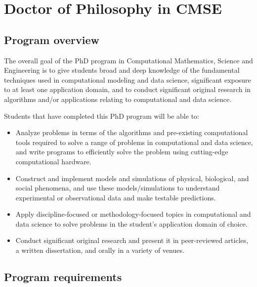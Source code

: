 \section{Doctor of Philosophy in CMSE}
\label{sec:phd}

\subsection{Program overview}
\label{sec:phd_overview}

The overall goal of the PhD program in Computational Mathematics,
Science and Engineering is to give students broad and deep knowledge
of the fundamental techniques used in computational modeling and data
science, significant exposure to at least one application domain, and
to conduct significant original research in algorithms and/or
applications relating to computational and data science.

\vspace{2mm}
\noindent
Students that have completed this PhD program will be able to:

\begin{itemize}
\item  Analyze problems in terms of the algorithms and pre-existing
  computational tools required to solve a range of problems in
  computational and data science, and write programs to efficiently
  solve the problem using cutting-edge computational hardware.  

\item  Construct and implement models and simulations of physical,
  biological, and social phenomena, and use these models/simulations
  to understand experimental or observational data and make testable predictions.  

\item  Apply discipline-focused or methodology-focused topics in
  computational and data science to solve problems in the student’s
  application domain of choice.

\item  Conduct significant original research and present it in
  peer-reviewed articles, a written dissertation, and orally in a
  variety of venues.  


\end{itemize}


\subsection{Program requirements}
\label{sec:phd_requirements}

